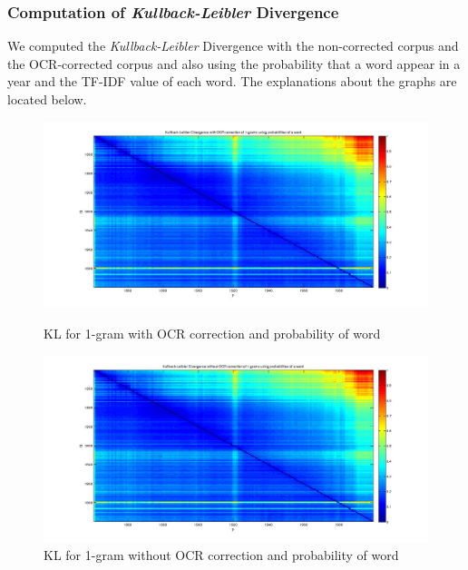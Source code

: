 \subsubsection{Computation of \emph{Kullback-Leibler} Divergence}
We computed the \emph{Kullback-Leibler} Divergence with the non-corrected corpus and the OCR-corrected corpus and also using the probability that a word appear in a year and the TF-IDF value of each word. The explanations about the graphs are located below.

\begin{figure}[h!]
    \begin{minipage}[b]{0.48\linewidth}
        \includegraphics[scale=0.15]{Pictures/kullback-leibler/KL_1-grams_with_correction_proba.jpg}
        \caption{KL for 1-gram with OCR correction and probability of word}
        \label{KL-PC1}
    \end{minipage}\hfill
    \begin{minipage}[b]{0.5\linewidth}
        \includegraphics[scale=0.15]{Pictures/kullback-leibler/KL_1-grams_without_correction_proba.jpg}
        \caption{KL for 1-gram without OCR correction and probability of word}
        \label{KL-PN1}
    \end{minipage}\hfill
\end{figure}

